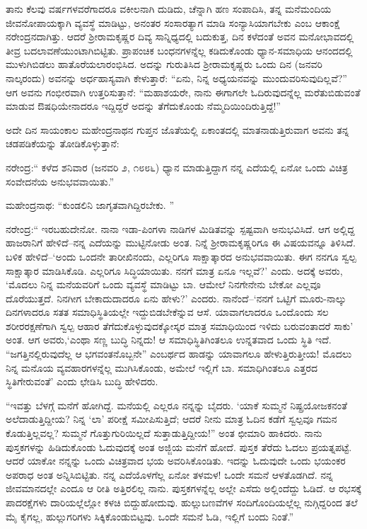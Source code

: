 ತಾನು ಕೆಲವು ವರ್ಷಗಳವರೆಗಾದರೂ ವಕೀಲನಾಗಿ ದುಡಿದು, ಚೆನ್ನಾಗಿ ಹಣ ಸಂಪಾದಿಸಿ, ತನ್ನ ಮನೆಮಂದಿಯ ಜೀವನೋಪಾಯಕ್ಕಾಗಿ ವ್ಯವಸ್ಥೆ ಮಾಡಿಟ್ಟು, ಅನಂತರ ಸಂಸಾರತ್ಯಾಗ ಮಾಡಿ ಸಂನ್ಯಾಸಿಯಾಗಬೇಕು ಎಂಬ ಆಕಾಂಕ್ಷೆ ನರೇಂದ್ರನದಾಗಿತ್ತು. ಆದರೆ ಶ್ರೀರಾಮಕೃಷ್ಣರ ದಿವ್ಯ ಸಾನ್ನಿಧ್ಯದಲ್ಲಿ ಬದುಕುತ್ತ, ದಿನ ಕಳೆದಂತೆ ಅವನ ಮನೋಭಾವದಲ್ಲಿ ತೀವ್ರ ಬದಲಾವಣೆಯುಂಟಾಗಿಬಿಟ್ಟಿತು. ಪ್ರಾಪಂಚಿಕ ಬಂಧನಗಳನ್ನೆಲ್ಲ ಕಡಿದುಕೊಂಡು ಧ್ಯಾನ-ಸಮಾಧಿಯ ಆನಂದದಲ್ಲಿ ಮುಳುಗಿಬಿಡಲು ಹಾತೊರೆಯಲಾರಂಭಿಸಿದ. ಅದನ್ನು ಗುರುತಿಸಿದ ಶ್ರೀರಾಮಕೃಷ್ಣರು ಒಂದು ದಿನ (ಜನವರಿ ನಾಲ್ಕರಂದು) ಅವನನ್ನು ಅರ್ಧಹಾಸ್ಯವಾಗಿ ಕೇಳುತ್ತಾರೆ: “ಏನು, ನಿನ್ನ ಅಧ್ಯಯನವನ್ನು ಮುಂದುವರಿಸುವುದಿಲ್ಲವೆ?” ಆಗ ಅವನು ಗಂಭೀರವಾಗಿ ಉತ್ತರಿಸುತ್ತಾನೆ: “ಮಹಾಶಯರೇ, ನಾನು ಈಗಾಗಲೇ ಓದಿರುವುದನ್ನೆಲ್ಲ ಮರೆತುಬಿಡುವಂತೆ ಮಾಡುವ ಔಷಧಿಯೇನಾದರೂ ಇದ್ದಿದ್ದರೆ ಅದನ್ನು ತೆಗೆದುಕೊಂಡು ನೆಮ್ಮದಿಯಿಂದಿರುತ್ತಿದ್ದೆ!”

ಅದೇ ದಿನ ಸಾಯಂಕಾಲ ಮಹೇಂದ್ರನಾಥನ ಗುಪ್ತನ ಜೊತೆಯಲ್ಲಿ ಏಕಾಂತದಲ್ಲಿ ಮಾತನಾಡುತ್ತಿರುವಾಗ ಅವನು ತನ್ನ ಚಡಪಡಿಕೆಯನ್ನು ತೋಡಿಕೊಳ್ಳುತ್ತಾನೆ:

ನರೇಂದ್ರ:“ ಕಳೆದ ಶನಿವಾರ (ಜನವರಿ ೨, ೧೮೮೬) ಧ್ಯಾನ ಮಾಡುತ್ತಿದ್ದಾಗ ನನ್ನ ಎದೆಯಲ್ಲಿ ಏನೋ ಒಂದು ವಿಚಿತ್ರ ಸಂವೇದನೆಯ ಅನುಭವವಾಯಿತು.”

ಮಹೇಂದ್ರನಾಥ: “ಕುಂಡಲಿನಿ ಜಾಗೃತವಾಗಿದ್ದಿರಬೇಕು. ”

ನರೇಂದ್ರ:“ ಇರಬಹುದೇನೋ. ನಾನಾ ಇಡಾ-ಪಿಂಗಳಾ ನಾಡಿಗಳ ಮಿಡಿತವನ್ನು ಸ್ಪಷ್ಟವಾಗಿ ಅನುಭವಿಸಿದೆ. ಆಗ ಅಲ್ಲಿದ್ದ ಹಾಜರಾನಿಗೆ ಹೇಳಿದೆ–ನನ್ನ ಎದೆಯನ್ನು ಮುಟ್ಟಿನೋಡು ಅಂತ. ನಿನ್ನೆ ಶ್ರೀರಾಮಕೃಷ್ಣರಿಗೂ ಈ ವಿಷಯವನ್ನೂ ತಿಳಿಸಿದೆ. ಬಳಿಕ ಹೇಳಿದೆ–‘ಅಂದು ಒಂದನೇ ತಾರೀಖಿನಂದು, ಎಲ್ಲರಿಗೂ ಸಾಕ್ಷಾತ್ಕಾರದ ಅನುಭವವಾಯಿತು. ಈಗ ನನಗೂ ಸ್ವಲ್ಪ ಸಾಕ್ಷಾತ್ಕಾರ ಮಾಡಿಸಿಕೊಡಿ. ಎಲ್ಲರಿಗೂ ಸಿದ್ಧಿಯಾಯಿತು. ನನಗೆ ಮಾತ್ರ ಏನೂ ಇಲ್ಲವೆ?’ ಎಂದು. ಅದಕ್ಕೆ ಅವರು, ‘ಮೊದಲು ನಿನ್ನ ಮನೆಯವರಿಗೆ ಒಂದು ವ್ಯವಸ್ಥೆ ಮಾಡಿಟ್ಟು ಬಾ. ಆಮೇಲೆ ನಿನಗೇನೇನು ಬೇಕೋ ಎಲ್ಲವೂ ದೊರೆಯುತ್ತದೆ. ನಿನಗೀಗ ಬೇಕಾದುದಾದರೂ ಏನು ಹೇಳು?’ ಎಂದರು. ನಾನೆಂದೆ–‘ನನಗೆ ಒಟ್ಟಿಗೆ ಮೂರು-ನಾಲ್ಕು ದಿನಗಳಾದರೂ ಸತತ ಸಮಾಧಿಸ್ಥಿತಿಯಲ್ಲೇ ಇದ್ದುಬಿಡಬೇಕೆನ್ನುವ ಆಸೆ. ಯಾವಾಗಲಾದರೂ ಒಂದೊಂದು ಸಲ ಶರೀರರಕ್ಷಣೆಗಾಗಿ ಸ್ವಲ್ಪ ಆಹಾರ ತೆಗೆದುಕೊಳ್ಳುವುದಕ್ಕೋಸ್ಕರ ಮಾತ್ರ ಸಮಾಧಿಯಿಂದ ಇಳಿದು ಬರುವಂತಾದರೆ ಸಾಕು’ ಅಂತ. ಆಗ ಅವರು,‘ಎಂಥಾ ಸಣ್ಣ ಬುದ್ಧಿ ನಿನ್ನದು! ಆ ಸಮಾಧಿಸ್ಥಿತಿಗಿಂತಲೂ ಉನ್ನತವಾದ ಒಂದು ಸ್ಥಿತಿ ಇದೆ. “ಜಗತ್ತಿನಲ್ಲಿರುವುದೆಲ್ಲ ಆ ಭಗವಂತನೊಬ್ಬನೇ” ಎಂಬರ್ಥದ ಹಾಡನ್ನು ಯಾವಾಗಲೂ ಹೇಳುತ್ತಿರುತ್ತೀಯ! ಮೊದಲು ನಿನ್ನ ಮನೊಯ ವ್ಯವಹಾರಗಳನ್ನೆಲ್ಲ ಮುಗಿಸಿಕೊಂಡು, ಅಮೇಲೆ ಇಲ್ಲಿಗೆ ಬಾ. ಸಮಾಧಿಗಿಂತಲೂ ಎತ್ತರದ ಸ್ಥಿತಿಗೇರುವಂತೆ’ ಎಂದು ಛೇಡಿಸಿ ಬುದ್ಧಿ ಹೇಳಿದರು.

“ಇವತ್ತು ಬೆಳಗ್ಗೆ ಮನೆಗೆ ಹೋಗಿದ್ದೆ. ಮನೆಯಲ್ಲಿ ಎಲ್ಲರೂ ನನ್ನನ್ನು ಬೈದರು. ‘ಯಾಕೆ ಸುಮ್ಮನೆ ನಿಷ್ಪ್ರಯೋಜಕನಂತೆ ಅಲೆದಾಡುತ್ತಿದ್ದೀಯ? ನಿನ್ನ ‘ಲಾ’ ಪರೀಕ್ಷೆ ಸಮೀಪಿಸುತ್ತಿದೆ; ಆದರೆ ನೀನು ಮಾತ್ರ ಓದಿನ ಕಡೆಗೆ ಸ್ವಲ್ಪವೂ ಗಮನ ಕೊಡುತ್ತಿಲ್ಲವಲ್ಲ? ಸುಮ್ಮನೆ ಗೊತ್ತುಗುರಿಯಿಲ್ಲದೆ ಸುತ್ತಾಡುತ್ತಿದ್ದೀಯ!” ಅಂತ ಛೀಮಾರಿ ಹಾಕಿದರು. ನಾನು ಪುಸ್ತಕಗಳನ್ನು ಹಿಡಿದುಕೊಂಡು ಓದುವುದಕ್ಕೆ ಅಂತ ಅಜ್ಜಿಯ ಮನೆಗೆ ಹೋದೆ. ಪುಸ್ತಕ ತೆರೆದು ಓದಲು ಪ್ರಯತ್ನಪಟ್ಟೆ. ಆದರೆ ಯಾಕೋ ನನ್ನನ್ನು ಒಂದು ವಿಚಿತ್ರವಾದ ಭಯ ಅವರಿಸಿಕೊಂಡಿತು. ಇದನ್ನು ಓದುವುದೇ ಒಂದು ಭಯಂಕರ ಅಪರಾಧ ಅಂತ ಅನ್ನಿಸಿಬಿಟ್ಟಿತು. ನನ್ನ ಎದೆಯೊಳಗೆಲ್ಲ ಏನೋ ತಳಮಳ! ಒಂದೇ ಸಮನೆ ಆಳತೊಡಗಿದೆ. ನನ್ನ ಜೀವಮಾನದಲ್ಲೇ ಎಂದೂ ಆ ರೀತಿ ಅತ್ತಿರಲಿಲ್ಲ ನಾನು. ಪುಸ್ತಕಗಳನ್ನೆಲ್ಲ ಅಲ್ಲೇ ಎಸೆದು ಅಲ್ಲಿಂದೆದ್ದು ಓಡಿದೆ. ಆ ರಭಸಕ್ಕೆ ಪಾದರಕ್ಷೆಗಳು ದಾರಿಯಲ್ಲೆಲ್ಲೋ ಕಳಚಿ ಬಿದ್ದುಹೋದುವು. ಹುಲ್ಲುಬಣವೆಗಳ ಸಂದಿಗೊಂದಿಯಲ್ಲೆಲ್ಲ ನುಗ್ಗಿದ್ದರಿಂದ ತಲೆ ಮೈ ಕೈಗಲ್ಲ, ಹುಲ್ಲುಗರಿಗಳು ಸಿಕ್ಕಿಕೊಂಡುಬಿಟ್ಟವು. ಒಂದೇ ಸಮನೆ ಓಡಿ, ಇಲ್ಲಿಗೆ ಬಂದು ನಿಂತೆ.”

